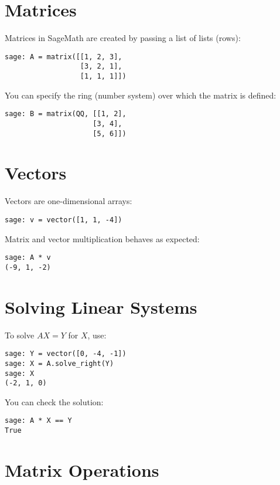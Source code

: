 \documentclass[12pt]{book}
\begin{document}
\section{Matrices}

Matrices in SageMath are created by passing a list of lists (rows):

\begin{verbatim}
sage: A = matrix([[1, 2, 3], 
                  [3, 2, 1], 
                  [1, 1, 1]])
\end{verbatim}

You can specify the ring (number system) over which the matrix is defined:

\begin{verbatim}
sage: B = matrix(QQ, [[1, 2], 
                     [3, 4], 
                     [5, 6]])
\end{verbatim}

\section{Vectors}

Vectors are one-dimensional arrays:

\begin{verbatim}
sage: v = vector([1, 1, -4])
\end{verbatim}

Matrix and vector multiplication behaves as expected:

\begin{verbatim}
sage: A * v
(-9, 1, -2)
\end{verbatim}

\section{Solving Linear Systems}

To solve \(AX = Y\) for \(X\), use:

\begin{verbatim}
sage: Y = vector([0, -4, -1])
sage: X = A.solve_right(Y)
sage: X
(-2, 1, 0)
\end{verbatim}

You can check the solution:

\begin{verbatim}
sage: A * X == Y
True
\end{verbatim}

\section{Matrix Operations}
\end{document}
